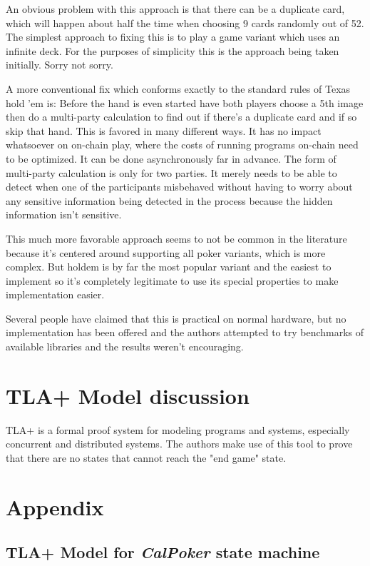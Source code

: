\documentclass[a4paper]{article}
\begin{document}
\begin{multicols}{2}
An obvious problem with this approach is that there can be a duplicate card, which will happen about half the time when choosing 9 cards randomly out of 52. The simplest approach to fixing this is to play a game variant which uses an infinite deck. For the purposes of simplicity this is the approach being taken initially. Sorry not sorry.

A more conventional fix which conforms exactly to the standard rules of Texas hold 'em is: Before the hand is even started have both players choose a 5th image then do a multi-party calculation to find out if there’s a duplicate card and if so skip that hand. This is favored in many different ways. It has no impact whatsoever on on-chain play, where the costs of running programs on-chain need to be optimized. It can be done asynchronously far in advance. The form of multi-party calculation is only for two parties. It  merely needs to be able to detect when one of the participants misbehaved without having to worry about any sensitive information being detected in the process because the hidden information isn’t sensitive. 

This much more favorable approach seems to not be common in the literature because it’s centered around supporting all poker variants, which is more complex. But holdem is by far the most popular variant and the easiest to implement so it’s completely legitimate to use its special properties to make implementation easier.

Several people have claimed that this is practical on normal hardware, but no implementation has been offered and the authors attempted to try benchmarks of available libraries and the results weren’t encouraging.



\section{TLA+ Model discussion}

TLA+ \cite{2} is a formal proof system for modeling programs and systems, especially concurrent and distributed systems. The authors make use of this tool to prove that there are no states that cannot reach the "end game" state. 

\section{Appendix}

\subsection{TLA+ Model for \textit{CalPoker} state machine}




\end{multicols}
\end{document}

